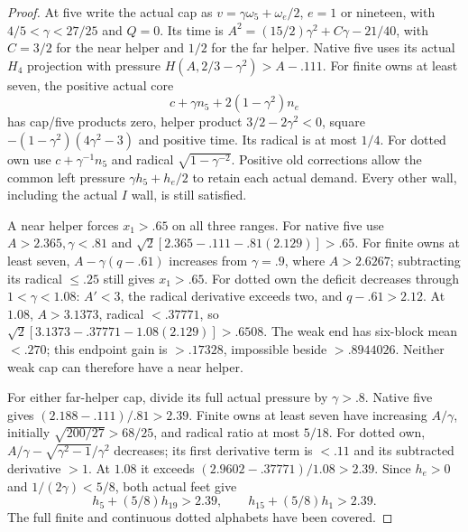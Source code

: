 \begin{proof}
At five write the actual cap as $v=\gamma\omega_5+\omega_e/2$,
$e=1$ or nineteen, with $4/5<\gamma<27/25$ and $Q=0$.
Its time is $A^2=(15/2)\gamma^2+C\gamma-21/40$, with
$C=3/2$ for the near helper and $1/2$ for the far helper.
Native five uses its actual $H_4$ projection with pressure
$H(A,2/3-\gamma^2)>A-.111$.
For finite owns at least seven, the positive actual core
\[
 c+\gamma n_5+2(1-\gamma^2)n_e
\]
has cap/five products zero, helper product $3/2-2\gamma^2<0$,
square $-(1-\gamma^2)(4\gamma^2-3)$ and positive time.
Its radical is at most $1/4$. For dotted own use
$c+\gamma^{-1}n_5$ and radical $\sqrt{1-\gamma^{-2}}$.
Positive old corrections allow the common left pressure
$\gamma h_5+h_e/2$ to retain each actual demand. Every other
wall, including the actual $I$ wall, is still satisfied.

A near helper forces $x_1>.65$ on all three ranges.
For native five use $A>2.365,\gamma<.81$ and
$\sqrt2[2.365-.111-.81(2.129)]>.65$.
For finite owns at least seven, $A-\gamma(q-.61)$ increases
from $\gamma=.9$, where $A>2.6267$; subtracting its radical
$\le.25$ still gives $x_1>.65$.
For dotted own the deficit decreases through $1<\gamma<1.08$:
$A'<3$, the radical derivative exceeds two, and $q-.61>2.12$.
At $1.08$, $A>3.1373$, radical $<.37771$, so
$\sqrt2[3.1373-.37771-1.08(2.129)]>.6508$.
The weak end has six-block mean $<.270$; this endpoint gain is
$>.17328$, impossible beside $>.8944026$. Neither weak cap
can therefore have a near helper.

For either far-helper cap, divide its full actual pressure by
$\gamma>.8$. Native five gives $(2.188-.111)/.81>2.39$.
Finite owns at least seven have increasing $A/\gamma$, initially
$\sqrt{200/27}>68/25$, and radical ratio at most $5/18$.
For dotted own, $A/\gamma-\sqrt{\gamma^2-1}/\gamma^2$ decreases;
its first derivative term is $<.11$ and its subtracted derivative
$>1$. At $1.08$ it exceeds $(2.9602-.37771)/1.08>2.39$.
Since $h_e>0$ and $1/(2\gamma)<5/8$, both actual feet give
\[
 h_5+(5/8)h_{19}>2.39,\qquad
 h_{15}+(5/8)h_1>2.39.
\]
The full finite and continuous dotted alphabets have been covered.


\end{proof}
